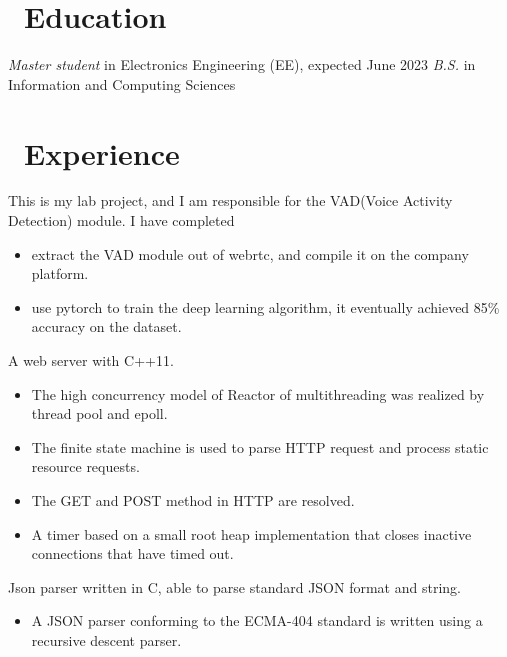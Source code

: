 \documentclass{resume}
\begin{document}



\section{\faGraduationCap\ Education}
\textit{Master student} in Electronics Engineering (EE), expected June 2023
\textit{B.S.} in Information and Computing Sciences

\section{\faUsers\ Experience}
\role{Intern}{Lab Project}
This is my lab project, and I am responsible for the VAD(Voice Activity Detection) module. I have completed
\begin{itemize}
    \item extract the VAD module out of webrtc, and compile it on the company platform.
    \item use pytorch to train the deep learning algorithm, it eventually achieved 85\% accuracy on the dataset.
\end{itemize}

A web server with C++11.
\begin{itemize}
    \item The high concurrency model of Reactor of multithreading was realized by thread pool and epoll.
    \item The finite state machine is used to parse HTTP request and process static resource requests.
    \item The GET and POST method in HTTP are resolved.
    \item A timer based on a small root heap implementation that closes inactive connections that have timed out.
\end{itemize}

Json parser written in C, able to parse standard JSON format and string.
\begin{itemize}
    \item A JSON parser conforming to the ECMA-404 standard is written using a recursive descent parser.
\end{itemize}
\end{document}
